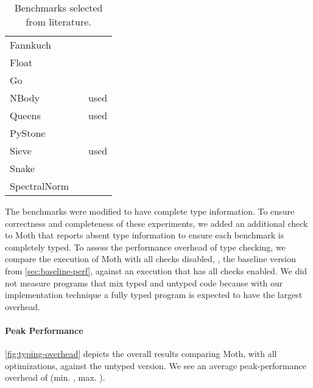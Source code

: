 \begin{table}[htb]
  \caption{Benchmarks selected from literature.}
  \label{tab:gradual-benchmarks}
  \begin{center}
    \begin{tabular}{l l r}
      Fannkuch & \cite{Vitousek2017,Greenman2018} \\
      Float & \cite{Vitousek2017,Muehlboeck2017,Greenman2018} \\
      Go & \cite{Vitousek2017,Muehlboeck2017,Greenman2018} \\
      NBody & \cite{Kuhlenschmidt:2018:preprint,Vitousek2017,Greenman2018} & used \cite{Marr2016} \\
      Queens & \cite{Vitousek2017,Muehlboeck2017,Greenman2018} & used \cite{Marr2016} \\
      PyStone & \cite{Vitousek2017,Muehlboeck2017,Greenman2018} \\
      Sieve & \cite{Takikawa2016,Muehlboeck2017,Bauman2017,Richards2017} & used \cite{Marr2016} \\
      Snake & \cite{Takikawa2016,Muehlboeck2017,Bauman2017,Richards2017} \\
      SpectralNorm & \cite{Vitousek2017,Muehlboeck2017,Greenman2018} \\
    \end{tabular}  
  \end{center}
\end{table}

The benchmarks were modified to have complete type information.
To ensure correctness and completeness of these experiments,
we added an additional check to Moth that
reports absent type information to ensure each benchmark is completely typed.
To assess the performance overhead of type checking,
we compare the execution of Moth with all checks disabled, \ie, the baseline version from 
\cref{sec:baseline-perf}, against an execution that has all checks enabled.
We did not measure programs that mix typed and untyped code
because with our implementation technique a fully typed program is expected to
have the largest overhead.

\paragraph*{Peak Performance}

\cref{fig:typing-overhead} depicts
the overall results comparing Moth,
with all optimizations,
against the untyped version.
We see an average peak-performance overhead of 
\OverheadTypingGMeanP (min. \OverheadTypingMinP, max. \OverheadTypingMaxP).

